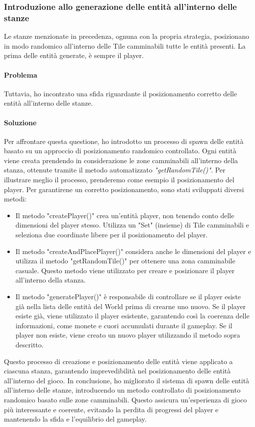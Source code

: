\documentclass[a4paper,12pt]{report}
\begin{document}
\subsubsection*{Introduzione allo generazione delle entità all'interno delle stanze}
Le stanze menzionate in precedenza, ognuna con la propria strategia, posizionano in modo randomico all'interno delle Tile camminabili tutte le entità presenti.
La prima delle entità generate, è sempre il player.
\paragraph*{Problema}
Tuttavia, ho incontrato una sfida riguardante il posizionamento corretto delle entità all'interno delle stanze.
\paragraph*{Soluzione}
Per affrontare questa questione, ho introdotto un processo di spawn delle entità basato su un approccio di posizionamento randomico controllato. 
Ogni entità viene creata prendendo in considerazione le zone camminabili all'interno della stanza, ottenute tramite il metodo automatizzato \textit{"getRandomTile()"}.
Per illustrare meglio il processo, prenderemo come esempio il posizionamento del player. 
Per garantirene un corretto posizionamento, sono stati sviluppati diversi metodi:
\begin{itemize}
	\item Il metodo "createPlayer()" crea un'entità player, non tenendo conto delle dimensioni del player stesso.
	Utilizza un "Set" (insieme) di Tile camminabili e seleziona due coordinate libere per il posizionamento del player.  
	\item Il metodo "createAndPlacePlayer()" considera anche le dimensioni del player e utilizza il metodo "getRandomTile()" per ottenere una zona camminabile casuale. 
	Questo metodo viene utilizzato per creare e posizionare il player all'interno della stanza.
	\item Il metodo "generatePlayer()" è responsabile di controllare se il player esiste già nella lista delle entità del World prima di crearne uno nuovo. 
	Se il player esiste già, viene utilizzato il player esistente, garantendo così la coerenza delle informazioni, come monete e cuori accumulati durante il gameplay. 
	Se il player non esiste, viene creato un nuovo player utilizzando il metodo sopra descritto.
\end{itemize}
Questo processo di creazione e posizionamento delle entità viene applicato a ciascuna stanza, garantendo imprevedibilità nel posizionamento delle entità all'interno del gioco.
In conclusione, ho migliorato il sistema di spawn delle entità all'interno delle stanze, introducendo un metodo controllato di posizionamento randomico basato sulle zone camminabili. 
Questo assicura un'esperienza di gioco più interessante e coerente, evitando la perdita di progressi del player e mantenendo la sfida e l'equilibrio del gameplay.
\end{document}

